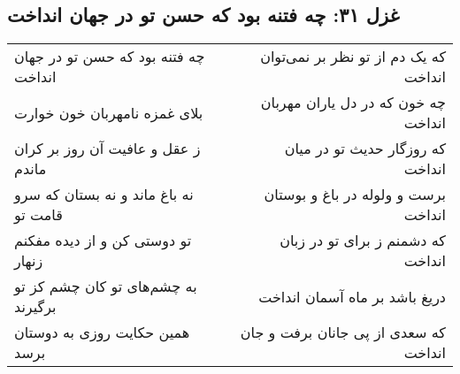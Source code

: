 \begin{center}
\section*{غزل ۳۱: چه فتنه بود که حسن تو در جهان انداخت}
\label{sec:031}
\begin{longtable}{l p{0.5cm} r}
چه فتنه بود که حسن تو در جهان انداخت
&&
که یک دم از تو نظر بر نمی‌توان انداخت
\\
بلای غمزه نامهربان خون خوارت
&&
چه خون که در دل یاران مهربان انداخت
\\
ز عقل و عافیت آن روز بر کران ماندم
&&
که روزگار حدیث تو در میان انداخت
\\
نه باغ ماند و نه بستان که سرو قامت تو
&&
برست و ولوله در باغ و بوستان انداخت
\\
تو دوستی کن و از دیده مفکنم زنهار
&&
که دشمنم ز برای تو در زبان انداخت
\\
به چشم‌های تو کان چشم کز تو برگیرند
&&
دریغ باشد بر ماه آسمان انداخت
\\
همین حکایت روزی به دوستان برسد
&&
که سعدی از پی جانان برفت و جان انداخت
\\
\end{longtable}
\end{center}
